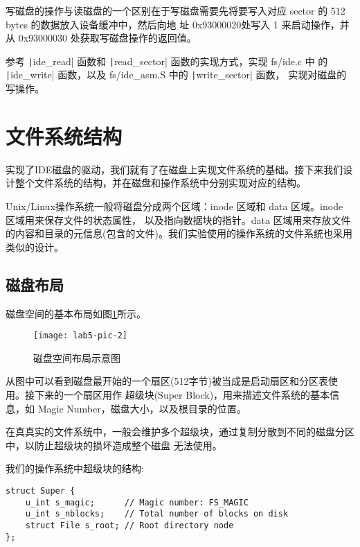 写磁盘的操作与读磁盘的一个区别在于写磁盘需要先将要写入对应 sector 的 512 bytes 的数据放入设备缓冲中，然后向地
址 0x93000020处写入 1 来启动操作，并从 0x93000030 处获取写磁盘操作的返回值。

\begin{exercise}
参考 \texttt|ide_read| 函数和 \texttt|read_sector| 函数的实现方式，实现 fs/ide.c 中
的 \texttt|ide_write| 函数，以及 fs/ide\_asm.S 中的 \texttt|write_sector| 函数，
实现对磁盘的写操作。
\end{exercise}

\section{文件系统结构}
实现了IDE磁盘的驱动，我们就有了在磁盘上实现文件系统的基础。接下来我们设计整个文件系统的结构，并在磁盘和操作系统中分别实现对应的结构。

\begin{note}
Unix/Linux操作系统一般将磁盘分成两个区域：inode 区域和 data 区域。inode 区域用来保存文件的状态属性，
以及指向数据块的指针。data 区域用来存放文件的内容和目录的元信息(包含的文件)。我们实验使用的操作系统的文件系统也采用类似的设计。
\end{note}

\subsection{磁盘布局}

磁盘空间的基本布局如图\ref{lab5-pic-2}所示。

\begin{figure}[htbp]
  \centering
  \texttt{[image: lab5-pic-2]}
  \caption{磁盘空间布局示意图}\label{lab5-pic-2}
\end{figure}

从图中可以看到磁盘最开始的一个扇区(512字节)被当成是启动扇区和分区表使用。接下来的一个扇区用作
超级块(Super Block)，用来描述文件系统的基本信息，如 Magic Number，磁盘大小，以及根目录的位置。

\begin{note}
在真真实的文件系统中，一般会维护多个超级块，通过复制分散到不同的磁盘分区中，以防止超级块的损坏造成整个磁盘
无法使用。
\end{note}

我们的操作系统中超级块的结构:

\begin{verbatim}
struct Super {
    u_int s_magic;      // Magic number: FS_MAGIC
    u_int s_nblocks;    // Total number of blocks on disk
    struct File s_root; // Root directory node
};
\end{verbatim}

